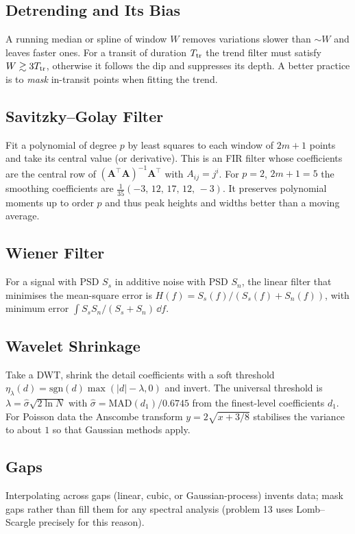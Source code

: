 \documentclass[11pt,a4paper]{article}
\begin{document}
\subsection{Detrending and Its Bias}
A running median or spline of window $W$ removes variations slower than $\sim W$ and leaves faster ones. For a transit of duration $T_{\rm tr}$ the trend filter must satisfy $W\gtrsim3T_{\rm tr}$, otherwise it follows the dip and suppresses its depth. A better practice is to \emph{mask} in-transit points when fitting the trend.

\subsection{Savitzky--Golay Filter}
Fit a polynomial of degree $p$ by least squares to each window of $2m+1$ points and take its central value (or derivative). This is an FIR filter whose coefficients are the central row of $(\mathbf A^\top\mathbf A)^{-1}\mathbf A^\top$ with $A_{ij}=j^i$. For $p=2$, $2m+1=5$ the smoothing coefficients are $\frac1{35}(-3,\,12,\,17,\,12,\,-3)$. It preserves polynomial moments up to order $p$ and thus peak heights and widths better than a moving average.

\subsection{Wiener Filter}
For a signal with PSD $S_s$ in additive noise with PSD $S_n$, the linear filter that minimises the mean-square error is $H(f)=S_s(f)/(S_s(f)+S_n(f))$, with minimum error $\int S_sS_n/(S_s+S_n)\,\dd f$.

\subsection{Wavelet Shrinkage}
Take a DWT, shrink the detail coefficients with a soft threshold $\eta_\lambda(d)=\mathrm{sgn}(d)\max(|d|-\lambda,0)$ and invert. The universal threshold is $\lambda=\hat\sigma\sqrt{2\ln N}$ with $\hat\sigma=\mathrm{MAD}(d_1)/0.6745$ from the finest-level coefficients $d_1$. For Poisson data the Anscombe transform $y=2\sqrt{x+3/8}$ stabilises the variance to about $1$ so that Gaussian methods apply.

\subsection{Gaps}
Interpolating across gaps (linear, cubic, or Gaussian-process) invents data; mask gaps rather than fill them for any spectral analysis (problem 13 uses Lomb--Scargle precisely for this reason).
\end{document}

